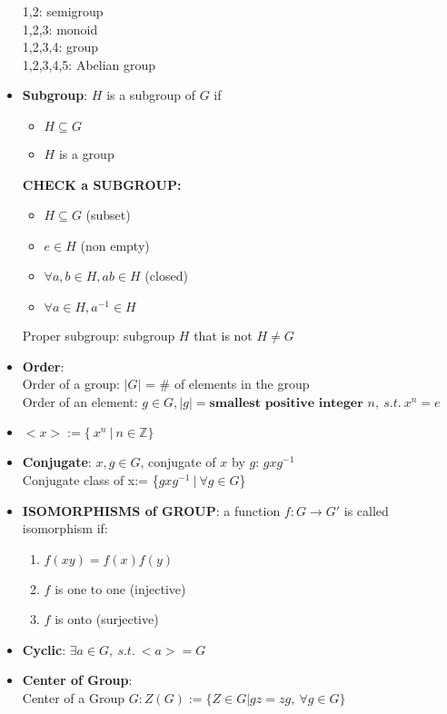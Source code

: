 \documentclass[12pt]{article}
\begin{document}
\begin{itemize}
        1,2: semigroup\\
        1,2,3: monoid\\
        1,2,3,4: group\\
        1,2,3,4,5: Abelian group
        \item \textbf{Subgroup}: $H$ is a subgroup of $G$ if
        \begin{itemize}
            \item $H \subseteq G$
            \item $H$ is a group
        \end{itemize}
        \textbf{CHECK a SUBGROUP:}
        \begin{itemize}
            \item $H \subseteq G$ (subset)
            \item $e \in H$ (non empty)
            \item $\forall a,b \in H, ab \in H$ (closed)
            \item $\forall a \in H, a^{-1} \in H$
        \end{itemize}
        Proper subgroup: subgroup $H$ that is not $H \ne G$
        \item \textbf{Order}:\\
        Order of a group: $|G|$ = \# of elements in the group\\
        Order of an element: $g\in G, |g| = \textbf{smallest positive integer }n, \ s.t. \ x^n = e$
        \item $<x> := \{\ x^n \ | \ n \in \mathbb{Z}\}$
        \item \textbf{Conjugate}: $x,g\in G$, conjugate of $x$ by $g$: $gxg^{-1}$\\
        Conjugate class of x:= \{$gxg^{-1} \ | \ \forall g \in G$\}
        \item \textbf{ISOMORPHISMS of GROUP}: a function $f : G \rightarrow G'$ is called isomorphism if:
        \begin{enumerate}
            \item $f(xy) = f(x)f(y)$
            \item $f$ is one to one (injective)
            \item $f$ is onto (surjective)
        \end{enumerate}
        \item \textbf{Cyclic}: $\exists a \in G, \ s.t. \ <a> = G$
        \item \textbf{Center of Group}:\\
        Center of a Group $G: Z(G):= \{Z\in G | gz = zg, \ \forall g \in G\}$\\

\end{itemize}
\end{document}
